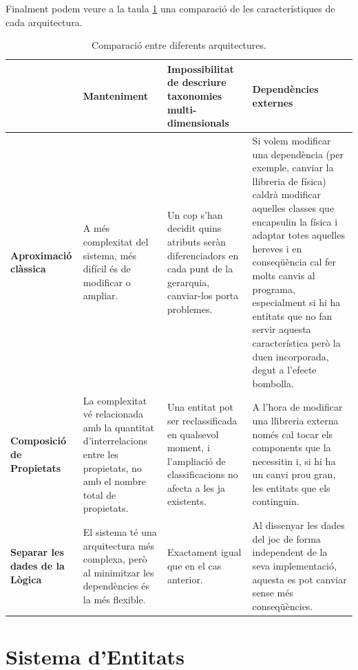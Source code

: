 Finalment podem veure a la taula \ref{tab:comparacioFilosofies} una comparació de les característiques de cada arquitectura.

\begin{table}
  \begin{tabular}{ | p{} | p{} | p{} | p{} | }
    \hline
     &
     {\bf Manteniment} &
     {\bf Impossibilitat de descriure taxonomies multi-dimensionals} &
     {\bf Dependències externes} \\
     \hline
     
     {\bf Aproximació clàssica} &
     A més complexitat del sistema, més difícil és de modificar o ampliar. &
     Un cop s'han decidit quins atributs seràn diferenciadors en cada punt de la gerarquia, canviar-los porta problemes. &
     Si volem modificar una dependència (per exemple, canviar la llibreria de física) caldrà modificar aquelles classes que encapsulin la física i adaptar totes aquelles hereves i en conseqüència cal fer molts canvis al programa, especialment si hi ha entitats que no fan servir aquesta característica però la duen incorporada, degut a l'efecte bombolla.\\
     \hline
     
     {\bf Composició de Propietats} &
     La complexitat vé relacionada amb la quantitat d'interrelacions entre les propietats, no amb el nombre total de propietats. &
     Una entitat pot ser reclassificada en qualsevol moment, i l'ampliació de classificacions no afecta a les ja existents. &
     A l'hora de modificar una llibreria externa només cal tocar els components que la necessitin i, si hi ha un canvi prou gran, les entitats que els continguin. \\
     \hline
     
     {\bf Separar les dades de la Lògica} &
     El sistema té una arquitectura més complexa, però al minimitzar les dependències és la més flexible. &
     Exactament igual que en el cas anterior. &
     Al dissenyar les dades del joc de forma independent de la seva implementació, aquesta es pot canviar sense més conseqüències. \\
     \hline
  \end{tabular}
  \caption{Comparació entre diferents arquitectures. \label{tab:comparacioFilosofies}}
\end{table}

\section{Sistema d'Entitats}

